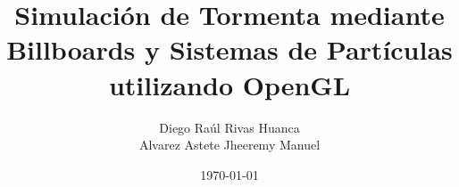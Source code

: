 \documentclass[12pt,a4paper]{report}
\title{Simulación de Tormenta mediante Billboards y Sistemas de Partículas utilizando OpenGL}
\author{Diego Raúl Rivas Huanca \\
Alvarez Astete Jheeremy Manuel}
\date{\today}
\begin{document}
\maketitle

\tableofcontents

\clearpage



















\nocite{*}



\end{document}
